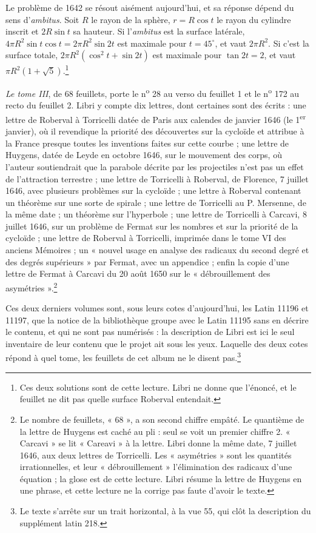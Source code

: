 \documentclass[11pt,a4paper]{article}
\begin{document}
Le problème de 1642 se résout aisément aujourd'hui, et sa réponse dépend du
sens d'\emph{ambitus}. Soit $R$ le rayon de la sphère, $r = R\cos t$ le rayon
du cylindre inscrit et $2R\sin t$ sa hauteur. Si l'\emph{ambitus} est la
surface latérale, $4\pi R^2 \sin t \cos t = 2\pi R^2 \sin 2t$ est maximale pour
$t = 45^\circ$, et vaut $2\pi R^2$. Si c'est la surface totale,
$2\pi R^2(\cos^2 t + \sin 2t)$ est maximale pour $\tan 2t = 2$, et vaut
$\pi R^2 (1 + \sqrt5)$.\footnote{Ces deux solutions sont de cette lecture. Libri
ne donne que l'énoncé, et le feuillet ne dit pas quelle surface Roberval
entendait.}

\emph{Le tome III}, de 68 feuillets, porte le n\textsuperscript{o} 28 au verso
du feuillet 1 et le n\textsuperscript{o} 172 au recto du feuillet 2. Libri y
compte dix lettres, dont certaines sont des écrits : une lettre de Roberval à
Torricelli datée de Paris aux calendes de janvier 1646 (le 1\textsuperscript{er}
janvier), où il revendique la priorité des découvertes sur la cycloïde et
attribue à la France presque toutes les inventions faites sur cette courbe ;
une lettre de Huygens, datée de Leyde en octobre 1646, sur le mouvement des
corps, où l'auteur soutiendrait que la parabole décrite par les projectiles
n'est pas un effet de l'attraction terrestre ; une lettre de Torricelli à
Roberval, de Florence, 7 juillet 1646, avec plusieurs problèmes sur la
cycloïde ; une lettre à Roberval contenant un théorème sur une sorte de
spirale ; une lettre de Torricelli au P. Mersenne, de la même date ; un
théorème sur l'hyperbole ; une lettre de Torricelli à Carcavi, 8 juillet 1646,
sur un problème de Fermat sur les nombres et sur la priorité de la cycloïde ;
une lettre de Roberval à Torricelli, imprimée dans le tome VI des anciens
Mémoires ; un « nouvel usage en analyse des radicaux du second degré et des
degrés supérieurs » par Fermat, avec un appendice ; enfin la copie d'une
lettre de Fermat à Carcavi du 20 août 1650 sur le « débrouillement des
asymétries ».\footnote{Le nombre de feuillets, « 68 », a son second chiffre
empâté. Le quantième de la lettre de Huygens est caché au pli : seul se voit
un premier chiffre 2. « Carcavi » se lit « Careavi » à la lettre. Libri donne
la même date, 7 juillet 1646, aux deux lettres de Torricelli. Les
« asymétries » sont les quantités irrationnelles, et leur « débrouillement »
l'élimination des radicaux d'une équation ; la glose est de cette lecture.
Libri résume la lettre de Huygens en une phrase, et cette lecture ne la
corrige pas faute d'avoir le texte.}

Ces deux derniers volumes sont, sous leurs cotes d'aujourd'hui, les Latin
11196 et 11197, que la notice de la bibliothèque groupe avec le Latin 11195
sans en décrire le contenu, et qui ne sont pas numérisés : la description de Libri est ici le seul inventaire de
leur contenu que le projet ait sous les yeux. Laquelle des deux cotes répond
à quel tome, les feuillets de cet album ne le disent pas.\footnote{Le texte
s'arrête sur un trait horizontal, à la vue 55, qui clôt la description du
supplément latin 218.}
\end{document}
